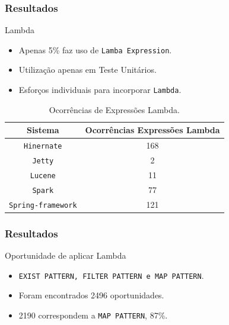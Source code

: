 \documentclass[]{beamer}
\begin{document}
	\begin{frame}[fragile, label=re]\frametitle{Resultados}
		\begin{block}{Lambda}
			\begin{itemize}
				\item Apenas 5\% faz uso de \texttt{Lamba Expression}.
				\item Utilização apenas em Teste Unitários.
				\item Esforços individuais para incorporar \texttt{Lambda}.
			\end{itemize}
		
			\begin{table}[h]\footnotesize
				\centering
				\caption{Ocorrências de Expressões Lambda.}
				\begin{tabular}{cc}
					\hline
					Sistema & Ocorrências Expressões Lambda\\ 
					\hline \hline
					\texttt{Hinernate} & 168 \\ 
					\texttt{Jetty} & 2 \\ 
					\texttt{Lucene} & 11 \\ 
					\texttt{Spark} & 77 \\ 
					\texttt{Spring-framework} & 121 \\ \hline
				\end{tabular}
				\label{tab:adocaoLambda} %
			\end{table}
		\end{block}
	\end{frame}	
	
	
	\begin{frame}[fragile, label=re]\frametitle{Resultados}
		\begin{block}{Oportunidade de aplicar Lambda}
			\begin{itemize}
				\item \texttt{EXIST PATTERN, FILTER PATTERN e MAP PATTERN}.
				\item Foram encontrados 2496 oportunidades.
				\item 2190 correspondem a \texttt{MAP PATTERN}, 87\%.
			\end{itemize}
		\end{block}
	\end{frame}
	
\end{document}
